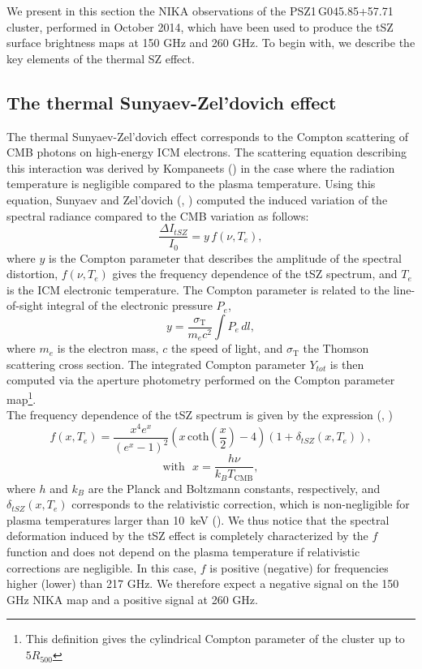 \documentclass[traditabstract]{aa}
\begin{document}
We present in this section the NIKA observations of the \mbox{PSZ1\,G045.85+57.71} cluster, performed in October 2014, which have been used to produce the tSZ surface brightness maps at 150 GHz and 260 GHz. To begin with, we describe  the key elements of the thermal SZ effect. 

\subsection{The thermal Sunyaev-Zel'dovich effect}
The thermal Sunyaev-Zel'dovich effect corresponds to the Compton scattering of CMB photons on high-energy ICM electrons. The scattering equation describing this interaction was derived by Kompaneets (\citealt{Kompaneets}) in the case where the radiation temperature is negligible compared to the plasma temperature. Using this equation, Sunyaev and Zel'dovich (\citealt{sun72}, \citealt{SZ_effect}) computed the induced variation of the spectral radiance compared to the CMB variation as follows:
\begin{equation}
        \frac{\Delta I_{tSZ}}{I_0} = y \, f(\nu, T_e),
\label{eq:deltaI}
\end{equation}
where $y$ is the Compton parameter that describes the amplitude of the spectral distortion, $f(\nu, T_e)$ gives the frequency dependence of the tSZ spectrum, and $T_e$ is the ICM electronic temperature. The Compton parameter is related to the line-of-sight integral of the electronic pressure $P_e$,
\begin{equation}
        y = \frac{\sigma_{\mathrm{T}}}{m_{e} c^2} \int P_{e} \, dl,
        \label{eq:y_compton}
\end{equation}
where $m_{e}$ is the electron mass, $c$ the speed of light, and $\sigma_{\mathrm{T}}$ the Thomson scattering cross section. The integrated Compton parameter $Y_{tot}$ is then computed via the aperture photometry performed on the Compton parameter map\footnote{This definition gives the cylindrical Compton parameter of the cluster up to $5R_{500}$}.\\The frequency dependence of the tSZ spectrum is given by the expression (\citealt{Birkinshaw}, \citealt{Carlstrom})
\begin{equation}
        f(x, T_e) = \frac{x^4e^x}{(e^x-1)^2}\left(x \, \mathrm{coth}\left(\frac{x}{2}\right) - 4 \right) (1+\delta_{tSZ}(x, T_e)),
        \label{eq:tSZ_spectrum}
\end{equation}
$$\mathrm{with}~~~x = \frac{h\nu}{k_B T_{\mathrm{CMB}}},$$
where $h$ and $k_B$ are the Planck and Boltzmann constants, respectively, and $\delta_{tSZ}(x, T_e)$ corresponds to the relativistic correction, which is non-negligible for plasma temperatures larger than 10~keV (\citealt{relat_corr}). We thus notice that the spectral deformation induced by the tSZ effect is completely characterized by the $f$ function and does not depend on the plasma temperature if relativistic corrections are negligible. In this case, $f$ is positive (negative) for frequencies higher (lower) than 217 GHz. We therefore expect a negative signal on the 150 GHz NIKA map and a positive signal at 260 GHz. 
\end{document}
